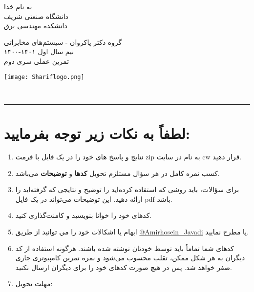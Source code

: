 \documentclass[a4paper]{article}
\begin{document}
\begin{minipage}{0.6\textwidth}
\begin{bf}
\begin{center}
	به نام خدا\\
	\vspace{0.25cm}
	دانشگاه صنعتی شریف\\
	\vspace{0.25cm}
	دانشکده مهندسی برق\\
	\vspace{0.5cm}

\large
گروه دکتر پاکروان - سیستم‌های مخابراتی \\
نیم سال اول
۱۴۰۱-۱۴۰۰\\
\Large
\vspace{0.4cm}
تمرین عملی سری دوم\\
\end{center}
\end{bf}
\normalsize
\end{minipage} \hfill
\begin{minipage}{0.35\textwidth}
\begin{flushleft}
\texttt{[image: Shariflogo.png]}\\ \large
\end{flushleft}

 \end{minipage}
\\

\rule[0.1\baselineskip]{\textwidth}{1.5pt}

\large

\section*{
لطفاً به نکات زیر توجه بفرمایید:
}
\begin{enumerate}
	\item 
نتایج و پاسخ های خود را در یک فایل با فرمت zip به نام
 در سایت  cw قرار دهید.
	\item 
کسب نمره کامل در هر سؤال مستلزم تحویل  \textbf{کدها} و \textbf{توضیحات} می‌باشد. 
\item 
برای سؤالات، باید روشی که استفاده کرده‌اید را توضیح  و نتایجی که گرفته‌اید را ارائه دهید. این توضیحات می‌تواند در یک فایل  pdf باشد.
\item 
کدهای خود را خوانا بنویسید و کامنت‌‌گذاری کنید.
\item
ابهام يا اشكالات خود را مي توانيد  از طریق
\href{https://t.me/Amirhosein_javadi}{@Amirhosein\_Javadi}
یا 
\href{mailto:javadiamirhosein.2000@gmail.com}{}
مطرح نماييد.
\item 
کدهای شما تماماً باید توسط خودتان نوشته شده باشند. هرگونه استفاده از کد دیگران به هر شکل ممکن، تقلب محسوب می‌شود و نمره تمرین کامپیوتری جاری صفر خواهد شد. پس در هیچ صورت کدهای خود را برای دیگران ارسال نکنید.

\item 
مهلت تحویل:  
\end{enumerate}
\clearpage
\end{document}
